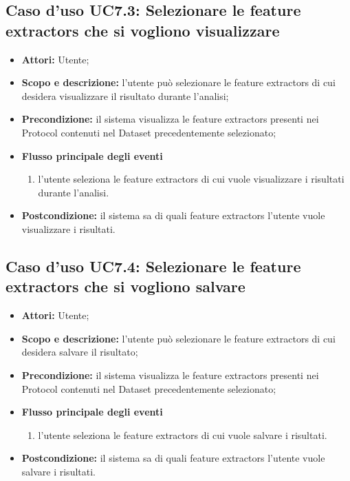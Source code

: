 \subsection{Caso d'uso UC7.3: Selezionare le feature extractors che si vogliono visualizzare}
\begin{itemize}
\item \textbf{Attori:} Utente;
\item \textbf{Scopo e descrizione:} l'utente può selezionare le feature extractors\glossario{} di cui desidera visualizzare il risultato durante l'analisi;
\item \textbf{Precondizione:} il sistema visualizza le feature extractors\glossario{} presenti nei Protocol\glossario{} contenuti nel Dataset\glossario{} precedentemente selezionato;
\item \textbf{Flusso principale degli eventi}
\begin{enumerate}
\item l'utente seleziona le feature extractors\glossario{} di cui vuole visualizzare i risultati durante l'analisi.
\end{enumerate}
\item \textbf{Postcondizione:} il sistema sa di quali feature extractors\glossario{} l'utente vuole visualizzare i risultati.
\end{itemize}


\subsection{Caso d'uso UC7.4: Selezionare le feature extractors che si vogliono salvare}
\begin{itemize}
\item \textbf{Attori:} Utente;
\item \textbf{Scopo e descrizione:} l'utente può selezionare le feature extractors\glossario{} di cui desidera salvare il risultato;
\item \textbf{Precondizione:} il sistema visualizza le feature extractors\glossario{} presenti nei Protocol\glossario{} contenuti nel Dataset\glossario{} precedentemente selezionato;
\item \textbf{Flusso principale degli eventi}
\begin{enumerate}
\item l'utente seleziona le feature extractors\glossario{} di cui vuole salvare i risultati.
\end{enumerate}
\item \textbf{Postcondizione:} il sistema sa di quali feature extractors\glossario{} l'utente vuole salvare i risultati.
\end{itemize}

